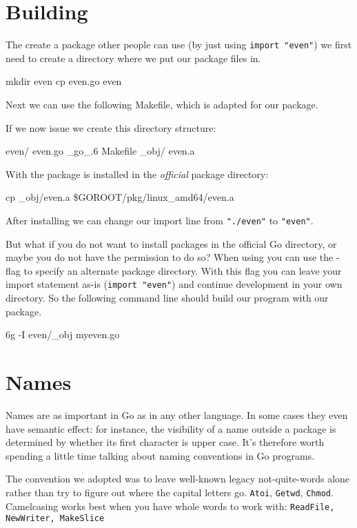 \section{Building}
The create a package other people can use (by just using
\lstinline{import "even"}) we first need to create a directory
where we put our package files in. 
\begin{display}
\pr mkdir even
\pr cp even.go even
\end{display}
Next we 
can use the following Makefile, which 
is adapted for our  package.

If we now issue  we create this directory structure:
\begin{display}
even/
    even.go
    \_go\_.6
    Makefile
    \_obj/
	even.a
\end{display}
With  the package is installed in the \emph{official}
package directory:
\begin{display}
\pr cp \_obj/even.a \$GOROOT/pkg/linux\_amd64/even.a
\end{display}
After installing we can change our import line from
\lstinline{"./even"} to \lstinline{"even"}.

But what if you do not want to install packages in the official Go
directory, or maybe you do not have the permission to do so? When using
 you can use the -flag to specify an alternate
package directory. With this flag you can leave your import statement
as-is (\lstinline{import "even"}) and continue development in your
own directory. So the following command line should build our
 program with our package.
\begin{display}
\pr 6g -I even/\_obj myeven.go
\end{display}

\section{Names}
Names are as important in Go as in any other language. In some cases
they even have semantic effect: for instance, the visibility of a name
outside a package is determined by whether its first character is upper
case. It's therefore worth spending a little time talking about naming
conventions in Go programs.

The convention we adopted was to leave well-known legacy
not-quite-words alone rather than try to figure out where
the capital letters go.  \lstinline{Atoi}, \lstinline{Getwd},
\lstinline{Chmod}.
Camelcasing works best when you have whole words
to work with: \lstinline{ReadFile, NewWriter, MakeSlice}

